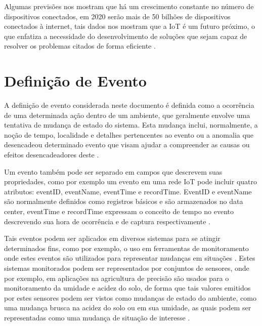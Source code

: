 \documentclass[ti,table]{texufpel} %
\begin{document}
  

  

Algumas previsões nos mostram que há um crescimento constante no número de dispositivos conectados, em 2020 serão mais de 50 bilhões de dispositivos conectados à internet, tais dados nos mostram que a IoT é um futuro próximo, o que enfatiza a necessidade do desenvolvimento de soluções que sejam capaz de resolver os problemas citados de forma eficiente \cite{xavier2016smart}. 

  

\section{Definição de Evento} 

A definição de evento considerada neste documento é definida como a ocorrência de uma determinada ação dentro de um ambiente, que geralmente envolve uma tentativa de mudança de estado do sistema. Esta mudança inclui, normalmente, a noção de tempo, localidade e detalhes pertencentes ao evento ou a anomalia que desencadeou determinado evento que visam ajudar a compreender as causas ou efeitos desencadeadores deste \cite{fitzgerald2010common}. 

Um evento também pode ser separado em campos que descrevem suas propriedades, como por exemplo um evento em uma rede IoT pode incluir quatro atributos: eventID, eventName, eventTime e recordTime. EventID e eventName são normalmente definidos como registros básicos e são armazenados no data center, eventTime e recordTime expressam o conceito de tempo no evento descrevendo sua hora de ocorrência e de captura respectivamente \cite{minbo2013information}.  

  

Tais eventos podem ser aplicados em diversos sistemas para se atingir determinados fins, como por exemplo, o uso em ferramentas de monitoramento onde estes eventos são utilizados para representar mudanças em situações \cite{etzion2011event}. Estes sistemas monitorados podem ser representados por conjuntos de sensores, onde por exemplo, em aplicações na agricultura de precisão são usados para o monitoramento da umidade e acidez do solo, de forma que tais valores emitidos por estes sensores podem ser vistos como mudanças de estado do ambiente, como uma mudança brusca na acidez do solo ou em sua umidade, as quais podem ser representadas como uma mudança de situação de interesse \cite{garcia2011wireless}. 

  
\end{document}
